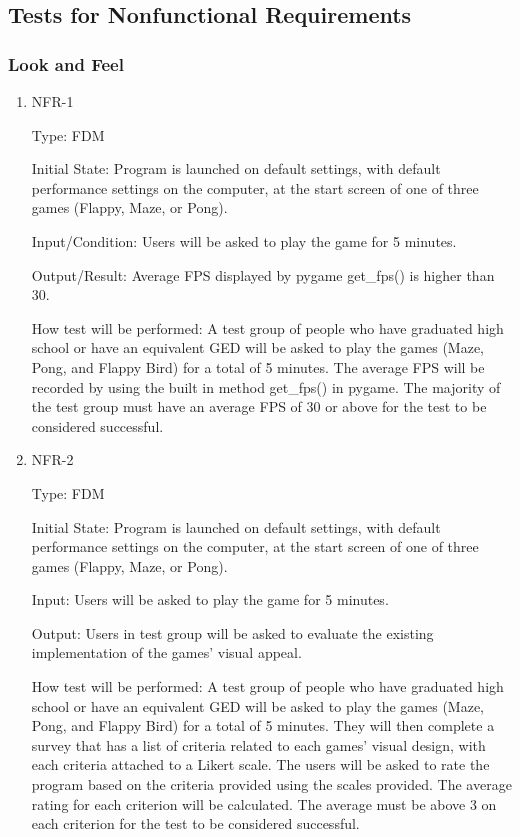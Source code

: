\documentclass[12pt, titlepage]{article}
\begin{document}
\subsection{Tests for Nonfunctional Requirements}

\subsubsection{Look and Feel}
	
\begin{enumerate}

\item{NFR-1\\}

Type: FDM
					
Initial State: Program is launched on default settings, with default performance settings on the computer, at the start screen of one of three games (Flappy, Maze, or Pong).
					
Input/Condition: Users will be asked to play the game for 5 minutes.
					
Output/Result: Average FPS displayed by pygame get\_fps() is higher than 30.
					
How test will be performed: A test group of people who have graduated high school or have an equivalent GED will be asked to play the games (Maze, Pong, and Flappy Bird) for a total of 5 minutes. The average FPS will be recorded by using the built in method get\_fps() in pygame. The majority of the test group must have an average FPS of 30 or above for the test to be considered successful.
					
\item{NFR-2\\}

Type: FDM
					
Initial State: Program is launched on default settings, with default performance settings on the computer, at the start screen of one of three games (Flappy, Maze, or Pong).
					
Input: Users will be asked to play the game for 5 minutes.
					
Output: Users in test group will be asked to evaluate the existing implementation of the games' visual appeal.
					
How test will be performed: A test group of people who have graduated high school or have an equivalent GED will be asked to play the games (Maze, Pong, and Flappy Bird) for a total of 5 minutes. They will then complete a survey that has a list of criteria related to each games' visual design, with each criteria attached to a Likert scale. The users will be asked to rate the program based on the criteria provided using the scales provided.  The average rating for each criterion will be calculated. The average must be above 3 on each criterion for the test to be considered successful. 

					

\end{enumerate}
\end{document}
